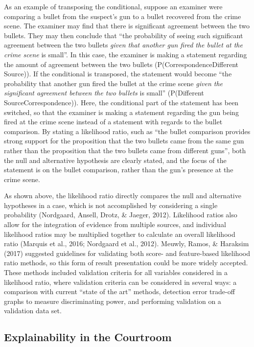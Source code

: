 \documentclass[print]{nuthesis}
\begin{document}
As an example of transposing the conditional, suppose an examiner were comparing a bullet from the suspect's gun to a bullet recovered from the crime scene.
The examiner may find that there is significant agreement between the two bullets.
They may then conclude that ``the probability of seeing such significant agreement between the two bullets \emph{given that another gun fired the bullet at the crime scene} is small''.
In this case, the examiner is making a statement regarding the amount of agreement between the two bullets (P(Correspondence\textbar Different Source)).
If the conditional is transposed, the statement would become ``the probability that another gun fired the bullet at the crime scene \emph{given the significant agreement between the two bullets} is small'' (P(Different Source\textbar Correspondence)).
Here, the conditional part of the statement has been switched, so that the examiner is making a statement regarding the gun being fired at the crime scene instead of a statement with regards to the bullet comparison.
By stating a likelihood ratio, such as ``the bullet comparison provides strong support for the proposition that the two bullets came from the same gun rather than the proposition that the two bullets came from different guns'', both the null and alternative hypothesis are clearly stated, and the focus of the statement is on the bullet comparison, rather than the gun's presence at the crime scene.

As shown above, the likelihood ratio directly compares the null and alternative hypotheses in a case, which is not accomplished by considering a single probability (Nordgaard, Ansell, Drotz, \& Jaeger, 2012).
Likelihood ratios also allow for the integration of evidence from multiple sources, and individual likelihood ratios may be multiplied together to calculate an overall likelihood ratio (Marquis et al., 2016; Nordgaard et al., 2012).
Meuwly, Ramos, \& Haraksim (2017) suggested guidelines for validating both score- and feature-based likelihood ratio methods, so this form of result presentation could be more widely accepted.
These methods included validation criteria for all variables considered in a likelihood ratio, where validation criteria can be considered in several ways: a comparison with current ``state of the art'' methods, detection error trade-off graphs to measure discriminating power, and performing validation on a validation data set.

\hypertarget{explainability-in-the-courtroom}{%
\subsection{Explainability in the Courtroom}\label{explainability-in-the-courtroom}}
\end{document}
